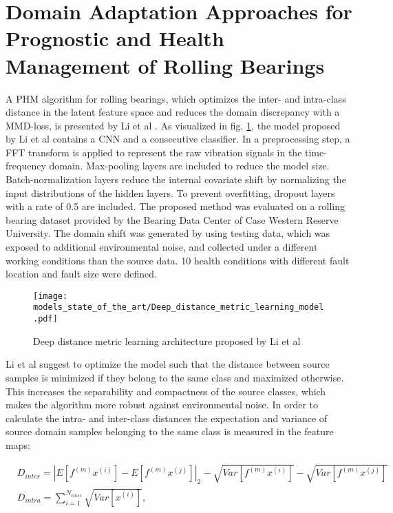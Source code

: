 \section{Domain Adaptation Approaches for Prognostic and Health Management of Rolling Bearings}


A PHM algorithm for rolling bearings, which optimizes the inter- and intra-class distance in the latent feature space and reduces the domain discrepancy with a MMD-loss, is presented by Li et al \cite{Li2018}. As visualized in fig. \ref{fig:Deep_distance_metric_learning_model}, the model proposed by Li et al contains a CNN and a consecutive classifier. In a preprocessing step, a FFT transform is applied to represent the raw vibration signals in the time-frequency domain. Max-pooling layers are included to reduce the model size. Batch-normalization layers reduce the internal covariate shift by normalizing the input distributions of the hidden layers. To prevent overfitting, dropout layers with a rate of 0.5 are included. The proposed method was evaluated on a rolling bearing dataset provided by the Bearing Data Center of Case Western Reserve University. The domain shift was generated by using testing data, which was exposed to additional environmental noise, and collected under a different working conditions than the source data. 10 health conditions with different fault location and fault size were defined. 

\begin{figure}[H]
  \centering
  \texttt{[image: models\_state\_of\_the\_art/Deep\_distance\_metric\_learning\_model.pdf]}
  \caption{Deep distance metric learning architecture proposed by Li et al \cite{Li2018}}
  \label{fig:Deep_distance_metric_learning_model}
\end{figure}

Li et al suggest to optimize the model such that the distance between source samples is minimized if they belong to the same class and maximized otherwise. This increases the separability and compactness of the source classes, which makes the algorithm more robust against environmental noise. In order to calculate the intra- and inter-class distances the expectation and variance of source domain samples belonging to the same class is measured in the feature maps:

\begin{equation}
    \begin{aligned}
       &D_{inter} = |E[f^{(m)}x^{(i)}]-E[f^{(m)}x^{(j)}]|_{2}-\sqrt{Var[f^{(m)}x^{(i)}]}-\sqrt{Var[f^{(m)}x^{(j)}]}\\
       &D_{intra} = 
        \sum_{i=1}^{N_{class}} \sqrt{Var[x^{(i)}]},
    \end{aligned}
\end{equation}


